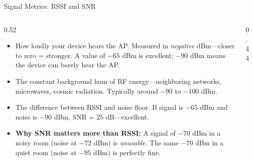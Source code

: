 \documentclass[aspectratio=169]{beamer}
\begin{document}
\begin{frame}{Signal Metrics: RSSI and SNR}
    \begin{columns}[T]
        \begin{column}{0.52\textwidth}
            \footnotesize
            \begin{itemize}
                \item {} How loudly your device hears the AP. Measured in \emph{negative} dBm---closer to zero = stronger. A value of $-65$ dBm is excellent; $-90$ dBm means the device can barely hear the AP.
                \item {} The constant background hum of RF energy---neighboring networks, microwaves, cosmic radiation. Typically around $-90$ to $-100$ dBm.
                \item {} The difference between RSSI and noise floor. If signal is $-65$ dBm and noise is $-90$ dBm, SNR = $25$ dB---excellent.
                \item \textbf{Why SNR matters more than RSSI:} A signal of $-70$ dBm in a noisy room (noise at $-72$ dBm) is \emph{unusable}. The same $-70$ dBm in a quiet room (noise at $-95$ dBm) is perfectly fine.
            \end{itemize}
        \end{column}
        \begin{column}{0.44\textwidth}
            \begin{table}[]
                \renewcommand{\arraystretch}{1.3}
                \centering
                \scriptsize
\end{table}
\end{column}
\end{columns}
\end{frame}
\end{document}

